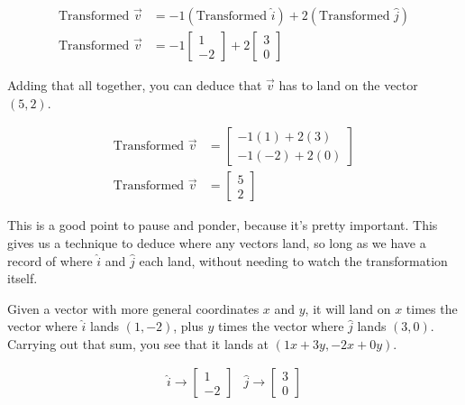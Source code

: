 \begin{align*}
  \text{Transformed } \vec{v} &= -1(\text{Transformed } \hat{i}) +
    2(\text{Transformed } \hat{j}) \\
  \text{Transformed } \vec{v} &= -1\begin{bmatrix}
    1 \\
    -2
  \end{bmatrix} + 2\begin{bmatrix}
    3 \\
    0
  \end{bmatrix}
\end{align*}

Adding that all together, you can deduce that $\vec{v}$ has to land on the
vector $(5, 2)$.

\begin{align*}
  \text{Transformed } \vec{v} &= \begin{bmatrix}
    -1(1) + 2(3) \\
    -1(-2) + 2(0)
  \end{bmatrix} \\
  \text{Transformed } \vec{v} &= \begin{bmatrix}
    5 \\
    2
  \end{bmatrix}
\end{align*}

This is a good point to pause and ponder, because it's pretty important. This
gives us a technique to deduce where any vectors land, so long as we have a
record of where $\hat{i}$ and $\hat{j}$ each land, without needing to watch the
transformation itself.

Given a vector with more general coordinates $x$ and $y$, it will land on $x$
times the vector where $\hat{i}$ lands $(1, -2)$, plus $y$ times the vector
where $\hat{j}$ lands $(3, 0)$. Carrying out that sum, you see that it lands at
$(1x + 3y, -2x + 0y)$.

\begin{equation*}
  \begin{array}{cc}
    \hat{i} \rightarrow \begin{bmatrix}
      1 \\
      -2
    \end{bmatrix} &
    \hat{j} \rightarrow \begin{bmatrix}
      3 \\
      0
    \end{bmatrix}
  \end{array}
\end{equation*}

